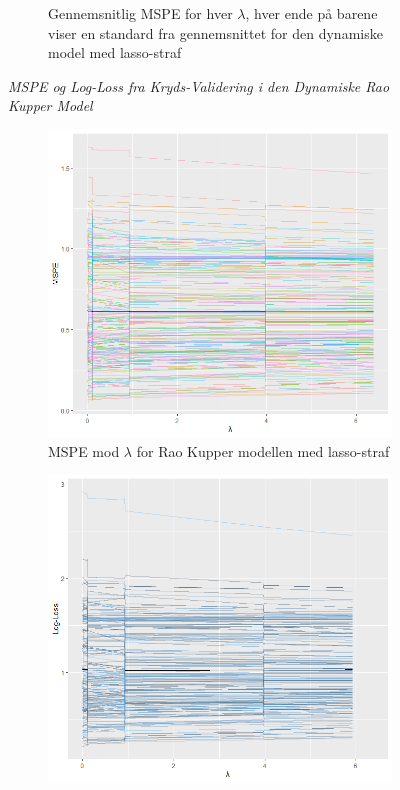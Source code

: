 \documentclass[11pt,a4paper]{article}
\begin{document}
\begin{figure}[h!]
\begin{subfigure}[b]{0.425\linewidth}
    \caption{Gennemsnitlig MSPE for hver $\lambda$, hver ende på barene viser en standard fra gennemsnittet for den dynamiske model med lasso-straf}
    \label{fig:MSPEBarDyn}
  \end{subfigure}
\caption{\textit{MSPE og Log-Loss fra Kryds-Validering i den Dynamiske Rao Kupper Model}}
  \label{fig:MSPELOGLOSDYN}
\end{figure}

\begin{figure}[h!]
  \centering
  \begin{subfigure}[b]{0.4\linewidth}
        \includegraphics[width=\textwidth]{MSPESTATISK.png}
    \caption{MSPE mod $\lambda$ for Rao Kupper modellen med lasso-straf}
    \label{fig:MSPEStat}
  \end{subfigure}
  \begin{subfigure}[b]{0.4\linewidth}
    \includegraphics[width=\textwidth]{LOGLOSSSTATISK.png}

\end{subfigure}
\end{figure}
\end{document}
